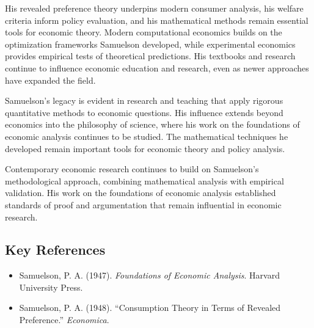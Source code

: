 His revealed preference theory underpins modern consumer analysis, his welfare criteria inform
policy evaluation, and his mathematical methods remain essential tools for economic theory. Modern
computational economics builds on the optimization frameworks Samuelson developed, while
experimental economics provides empirical tests of theoretical predictions. His textbooks and
research continue to influence economic education and research, even as newer approaches have
expanded the field.

Samuelson's legacy is evident in research and teaching that apply rigorous quantitative methods to
economic questions. His influence extends beyond economics into the philosophy of science, where
his work on the foundations of economic analysis continues to be studied. The mathematical
techniques he developed remain important tools for economic theory and policy analysis.

Contemporary economic research continues to build on Samuelson's methodological approach,
combining mathematical analysis with empirical validation. His work on the foundations of
economic analysis established standards of proof and argumentation that remain influential in
economic research.

\subsection*{Key References}
\begin{itemize}
    \item Samuelson, P. A. (1947). \textit{Foundations of Economic Analysis}. Harvard University Press.
    \item Samuelson, P. A. (1948). ``Consumption Theory in Terms of Revealed Preference.''
    \textit{Economica}.
\end{itemize}
